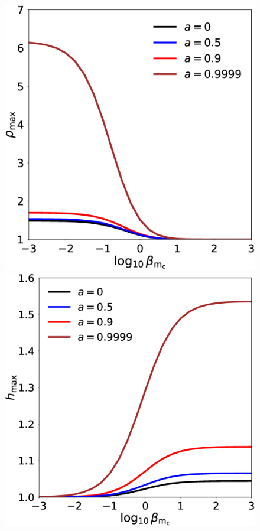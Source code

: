 \documentclass[twocolumn,aps,showpacs,showkeys,prd,superscriptaddress,byrevtex, amsmath]{revtex4-1}
\begin{document}
\begin{figure}
\hspace{-0.cm}
\\
\includegraphics[scale=0.2]{figures/fig7_Kerr_dens.eps}
\hspace{-0.cm}
\includegraphics[scale=0.2]{figures/fig7_Kerr_enth.eps}

\end{figure}
\end{document}
